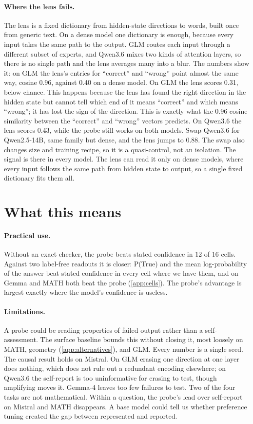 \documentclass{article}
\begin{document}
\paragraph{Where the lens fails.}
The lens is a fixed dictionary from hidden-state directions to words, built once from generic text.
On a dense model one dictionary is enough, because every input takes the same path to the output.
GLM routes each input through a different subset of experts, and Qwen3.6 mixes two kinds of attention layers, so there is no single path and the lens averages many into a blur.
The numbers show it: on GLM the lens's entries for ``correct'' and ``wrong'' point almost the same way, cosine 0.96, against 0.40 on a dense model.
On GLM the lens scores 0.31, below chance.
This happens because the lens has found the right direction in the hidden state but cannot tell which end of it means ``correct'' and which means ``wrong''; it has lost the sign of the direction.
This is exactly what the 0.96 cosine similarity between the ``correct'' and ``wrong'' vectors predicts.
On Qwen3.6 the lens scores 0.43, while the probe still works on both models.
Swap Qwen3.6 for Qwen2.5-14B, same family but dense, and the lens jumps to 0.88.
The swap also changes size and training recipe, so it is a quasi-control, not an isolation.
The signal is there in every model.
The lens can read it only on dense models, where every input follows the same path from hidden state to output, so a single fixed dictionary fits them all.

\section{What this means}
\label{sec:discussion}

\paragraph{Practical use.}
Without an exact checker, the probe beats stated confidence in 12 of 16 cells.
Against two label-free readouts it is closer: P(True) and the mean log-probability of the answer beat stated confidence in every cell where we have them, and on Gemma and MATH both beat the probe (\cref{app:cells}).
The probe's advantage is largest exactly where the model's confidence is useless.

\paragraph{Limitations.}
A probe could be reading properties of failed output rather than a self-assessment.
The surface baseline bounds this without closing it, most loosely on MATH, geometry (\cref{app:alternatives}), and GLM.
Every number is a single seed.
The causal result holds on Mistral.
On GLM erasing one direction at one layer does nothing, which does not rule out a redundant encoding elsewhere; on Qwen3.6 the self-report is too uninformative for erasing to test, though amplifying moves it.
Gemma-4 leaves too few failures to test.
Two of the four tasks are not mathematical.
Within a question, the probe's lead over self-report on Mistral and MATH disappears.
A base model could tell us whether preference tuning created the gap between represented and reported.
\end{document}
